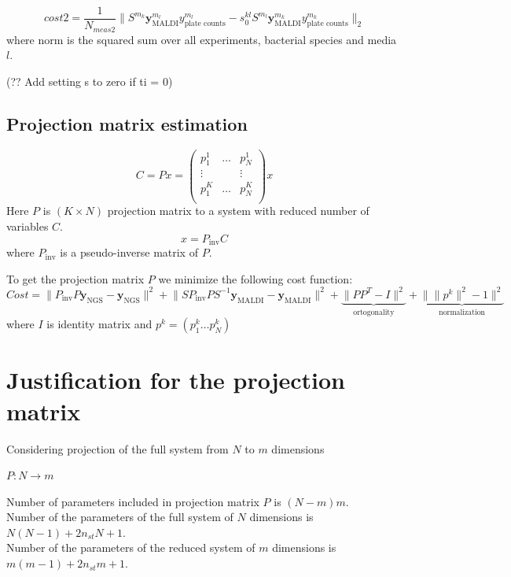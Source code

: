 \documentclass[10pt,A4paper]{article}
\begin{document}
\begin{equation}\boxed{
    cost2 = \frac{1}{N_{meas2}} \Big \lVert S^{m_k} \mathbf{y}^{m_l}_\text{MALDI} y^{m_l}_\text{plate counts} 
     -  s_0^{kl} S^{m_l} \mathbf{y}^{m_k}_\text{MALDI} y^{m_k}_\text{plate counts}  \Big \rVert _2}
\end{equation}
where norm is the squared sum over all experiments, bacterial species and media $l$.

(?? Add setting s to zero if ti = 0)


\subsection{Projection matrix estimation}

\begin{equation}
    C = Px = \begin{pmatrix}
        p^1_1 & \dots & p^1_N  \\
        \vdots &      & \vdots \\
        p^K_1 & \dots & p^K_N  \\
    \end{pmatrix} x
\end{equation}
Here $P$ is $(K \times N)$ projection matrix to a system with reduced number of variables $C$.
\begin{equation}
    x = P_\text{inv} C
\end{equation}
where $P_\text{inv}$ is a pseudo-inverse matrix of $P$.

To get the projection matrix $P$ we minimize the following cost function:
\begin{equation}
    Cost = \lVert P_\text{inv} P \mathbf{y}_\text{NGS} - \mathbf{y}_\text{NGS} \rVert^2 +
           \lVert S P_\text{inv} P S^{-1} \mathbf{y}_\text{MALDI} - \mathbf{y}_\text{MALDI} \rVert^2 +
           \underbrace{\lVert P P^T - I \rVert^2}_\text{ortogonality} +
           \underbrace{\lVert \lVert p^k \rVert^2  - 1\rVert^2}_\text{normalization}
\end{equation}
where $I$ is identity matrix and $p^k = (p^k_1 \dots p^k_N)$

\section{Justification for the projection matrix}
Considering projection of the full system from $N$ to $m$ dimensions

$P: N \rightarrow m$

Number of parameters included in projection matrix $P$ is $(N-m)m$.\\
Number of the parameters of the full system of $N$ dimensions is  $N(N-1) + 2 n_{st} N + 1$.\\
Number of the parameters of the reduced system of $m$ dimensions is  $m(m-1) + 2 n_{st} m + 1$.\\
\end{document}
